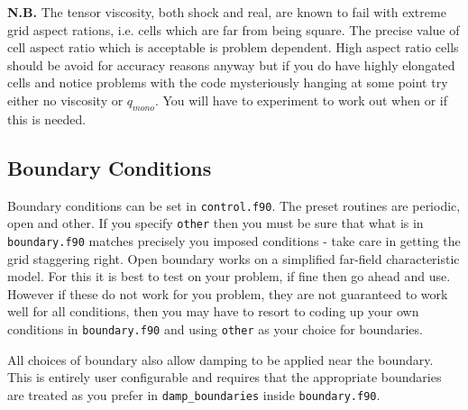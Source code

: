 \documentclass[11pt]{article}
\begin{document}
{\bf N.B.} The tensor viscosity, both shock and real, are known to fail with extreme grid aspect rations, i.e. cells which are far from being square. The precise value of cell aspect ratio which is acceptable is problem dependent. High aspect ratio cells should be avoid for accuracy reasons anyway but if you do have highly elongated cells and notice problems with the code mysteriously hanging at some point try either no viscosity or $q_{mono}$. You will have to experiment to work out when or if this is needed.

\subsection{Boundary Conditions}
Boundary conditions can be set in {\tt control.f90}. The preset routines are periodic, open and other. If you specify {\tt other} then you must be sure that what is in {\tt boundary.f90} matches precisely you imposed conditions - take care in getting the grid staggering right. Open boundary works on a simplified far-field characteristic model. For this it is best to test on your problem, if fine then go ahead and use. However if these do not work for you problem, they are not guaranteed to work well for all conditions, then you may have to resort to coding up your own conditions in {\tt boundary.f90} and using {\tt other} as your choice for boundaries.

All choices of boundary also allow damping to be applied near the boundary. This is entirely user configurable and requires that the appropriate boundaries are treated as you prefer in {\tt damp\_boundaries} inside {\tt boundary.f90}.   
\end{document}
